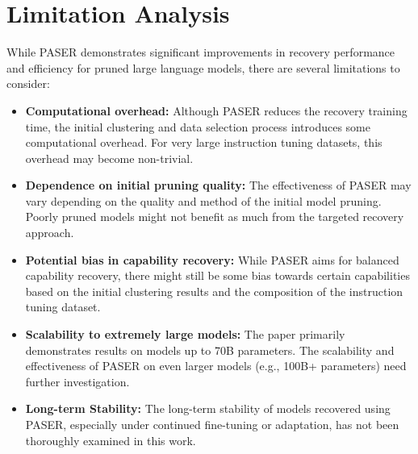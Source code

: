\section{Limitation Analysis}
While PASER demonstrates significant improvements in recovery performance and efficiency for pruned large language models, there are several limitations to consider:
\begin{itemize}[leftmargin=*]
    \item \textbf{Computational overhead:} Although PASER reduces the recovery training time, the initial clustering and data selection process introduces some computational overhead. For very large instruction tuning datasets, this overhead may become non-trivial.
    \item \textbf{Dependence on initial pruning quality:} The effectiveness of PASER may vary depending on the quality and method of the initial model pruning. Poorly pruned models might not benefit as much from the targeted recovery approach.
    \item \textbf{Potential bias in capability recovery:} While PASER aims for balanced capability recovery, there might still be some bias towards certain capabilities based on the initial clustering results and the composition of the instruction tuning dataset.
    \item \textbf{Scalability to extremely large models:} The paper primarily demonstrates results on models up to 70B parameters. The scalability and effectiveness of PASER on even larger models (e.g., 100B+ parameters) need further investigation.
    \item \textbf{Long-term Stability:} The long-term stability of models recovered using PASER, especially under continued fine-tuning or adaptation, has not been thoroughly examined in this work.
\end{itemize}


